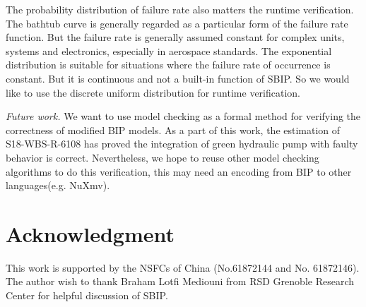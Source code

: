 \documentclass[conference]{IEEEtran}
\begin{document}
The probability distribution of failure rate also matters the runtime verification. The bathtub curve is generally regarded as a particular form of the failure rate function. But the failure rate is generally assumed constant for complex units, systems and electronics, especially in aerospace standards. The exponential distribution is suitable for situations where the failure rate of occurrence is constant. But it is continuous and not a built-in function of SBIP. So we would like to use the discrete uniform distribution for runtime verification.

\emph{Future work.}  We want to use model checking as a formal method for verifying the correctness of modified BIP models. As a part of this work, the estimation of S18-WBS-R-6108 has proved the integration of green hydraulic pump with faulty behavior is correct. Nevertheless, we hope to reuse other model checking algorithms to do this verification, this may need an encoding from BIP to other languages(e.g. NuXmv).

\section*{Acknowledgment}

This work is supported by the NSFCs of China (No.61872144 and No. 61872146). The author wish to thank Braham Lotfi Mediouni from RSD Grenoble Research Center for helpful discussion of SBIP.



\end{document}
